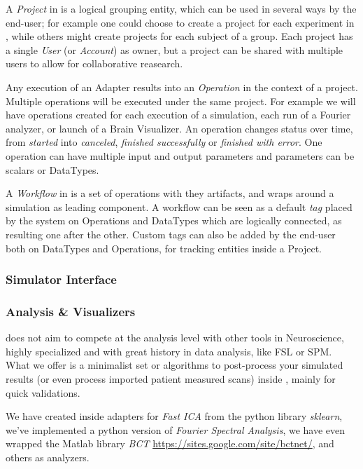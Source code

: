    A \emph{Project} in \TVB is a logical grouping entity, which  can be
    used in several ways by the end-user;  for example one could choose to
    create a project for each experiment in \TVB, while others might
    create projects for each subject of a group. Each project has a single
    \emph{User} (or \emph{Account}) as owner, but a project can be shared
    with multiple users to allow for collaborative reasearch.

    Any execution of an Adapter results into an \emph{Operation} in the
    context of a project. Multiple operations will be executed under the
    same project. For example we will have operations created for each
    execution of a simulation, each run of a Fourier analyzer, or launch
    of a Brain Visualizer. An operation changes status over time, from
    \emph{started} into \emph{canceled}, \emph{finished successfully} or
    \emph{finished with error}. One operation can have multiple input and
    output parameters and parameters can be scalars or DataTypes.

    A \emph{Workflow} in \TVB is a set of operations with they artifacts,
    and wraps around a simulation as leading component. A workflow can be
    seen as a default \emph{tag} placed by the system on Operations and
    DataTypes  which are logically connected, as resulting one after the
    other. Custom tags can also be added by the end-user both on DataTypes
    and Operations, for tracking entities inside a Project.

    \subsubsection{Simulator Interface}
    
    
    \subsubsection{Analysis \& Visualizers}

\TVB does not aim to compete at the analysis level with other tools in
Neuroscience,  highly specialized and with great history in data
analysis, like  FSL or SPM.  What we offer is a minimalist set or
algorithms to post-process your  simulated results (or even process
imported patient measured scans) inside \TVB, mainly for quick
validations.

We have created inside \TVB adapters for \emph{Fast ICA} from the
python library \emph{sklearn},  we've implemented a python version of
\emph{Fourier Spectral Analysis},  we have even wrapped the Matlab
library \emph{BCT} \url{https://sites.google.com/site/bctnet/}, and
others as analyzers.

